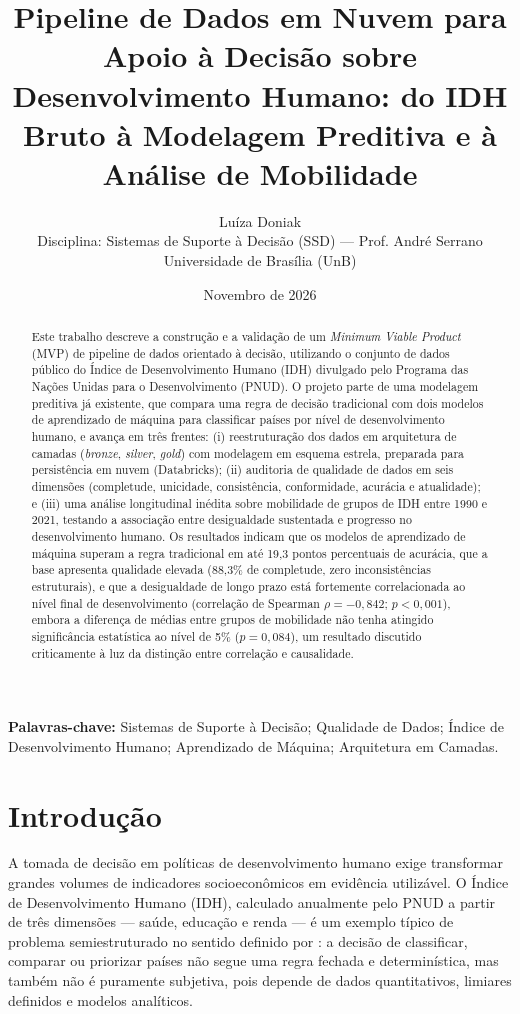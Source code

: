 \documentclass[11pt,a4paper]{article}
\title{\textbf{Pipeline de Dados em Nuvem para Apoio à Decisão sobre Desenvolvimento Humano: do IDH Bruto à Modelagem Preditiva e à Análise de Mobilidade}}
\author{Luíza Doniak \\ \small Disciplina: Sistemas de Suporte à Decisão (SSD) --- Prof. André Serrano \\ \small Universidade de Brasília (UnB)}
\date{Novembro de 2026}
\begin{document}
\maketitle
\thispagestyle{empty}

\begin{abstract}
\noindent Este trabalho descreve a construção e a validação de um \textit{Minimum Viable Product} (MVP) de pipeline de dados orientado à decisão, utilizando o conjunto de dados público do Índice de Desenvolvimento Humano (IDH) divulgado pelo Programa das Nações Unidas para o Desenvolvimento (PNUD). O projeto parte de uma modelagem preditiva já existente, que compara uma regra de decisão tradicional com dois modelos de aprendizado de máquina para classificar países por nível de desenvolvimento humano, e avança em três frentes: (i) reestruturação dos dados em arquitetura de camadas (\textit{bronze}, \textit{silver}, \textit{gold}) com modelagem em esquema estrela, preparada para persistência em nuvem (Databricks); (ii) auditoria de qualidade de dados em seis dimensões (completude, unicidade, consistência, conformidade, acurácia e atualidade); e (iii) uma análise longitudinal inédita sobre mobilidade de grupos de IDH entre 1990 e 2021, testando a associação entre desigualdade sustentada e progresso no desenvolvimento humano. Os resultados indicam que os modelos de aprendizado de máquina superam a regra tradicional em até 19,3 pontos percentuais de acurácia, que a base apresenta qualidade elevada (88,3\% de completude, zero inconsistências estruturais), e que a desigualdade de longo prazo está fortemente correlacionada ao nível final de desenvolvimento (correlação de Spearman $\rho = -0,842$; $p < 0,001$), embora a diferença de médias entre grupos de mobilidade não tenha atingido significância estatística ao nível de 5\% ($p = 0,084$), um resultado discutido criticamente à luz da distinção entre correlação e causalidade.
\end{abstract}

\vspace{0.3cm}
\noindent\textbf{Palavras-chave:} Sistemas de Suporte à Decisão; Qualidade de Dados; Índice de Desenvolvimento Humano; Aprendizado de Máquina; Arquitetura em Camadas.

\section{Introdução}

A tomada de decisão em políticas de desenvolvimento humano exige transformar grandes volumes de indicadores socioeconômicos em evidência utilizável. O Índice de Desenvolvimento Humano (IDH), calculado anualmente pelo PNUD a partir de três dimensões --- saúde, educação e renda --- é um exemplo típico de problema semiestruturado no sentido definido por \citet{gorry1971}: a decisão de classificar, comparar ou priorizar países não segue uma regra fechada e determinística, mas também não é puramente subjetiva, pois depende de dados quantitativos, limiares definidos e modelos analíticos.
\end{document}
